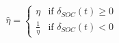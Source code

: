 \begin{equation}
\hat{\eta} =
	\begin{cases}
		\eta &\text{if } \delta_{SOC}(t) \geq 0 \\
		\frac{1}{\eta} &\text{if } \delta_{SOC}(t) < 0
	\end{cases}
\end{equation}
